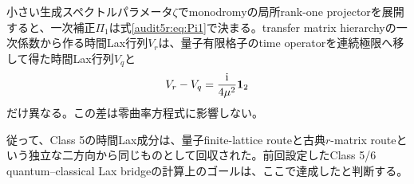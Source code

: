 小さい生成スペクトルパラメータ$\zeta$でmonodromyの局所rank-one projectorを展開すると、一次補正$\Pi_1$は式\eqref{audit5r:eq:Pi1}で決まる。transfer matrix hierarchyの一次係数から作る時間Lax行列$V_r$は、量子有限格子のtime operatorを連続極限へ移して得た時間Lax行列$V_q$と
\[
V_r-V_q=\frac{\mathrm i}{4\mu^2}\mathbf 1_2
\]
だけ異なる。この差は零曲率方程式に影響しない。

従って、Class 5の時間Lax成分は、量子finite-lattice routeと古典$r$-matrix routeという独立な二方向から同じものとして回収された。前回設定したClass 5/6 quantum--classical Lax bridgeの計算上のゴールは、ここで達成したと判断する。


